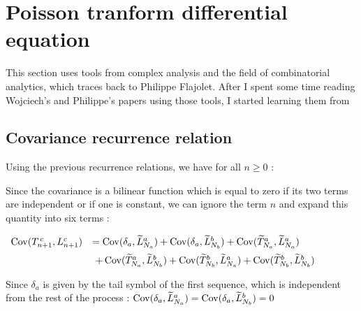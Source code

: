 \section{ Poisson tranform differential equation }

This section uses tools from complex analysis and the field 
of combinatorial analytics, which traces back to Philippe
Flajolet. After I spent some time reading Wojciech's and 
Philippe's papers using those tools, I started learning 
them from~\cite{ave}

\subsection{ Covariance recurrence relation }

Using the previous recurrence relations, we have for all $n\geq 0$ :


Since the covariance is a bilinear function which is equal
to zero if its two terms are independent or if one is constant,
we can ignore the term $n$ and expand this quantity into six terms :

\vspace{\baselineskip}
$
\begin{array}{rl}
   \operatorname{Cov}(T_{n+1}^{\,c}, L_{n+1}^c) 
    &
            = \operatorname{Cov}( \delta_a, {{\widetilde{L}}_{N_a}}^a )
              + \operatorname{Cov} (\delta_a,  {{\widetilde{L}}_{N_b}}^b)
              + \operatorname{Cov} ( {{\widetilde{T}}_{N_a}}^a,
                         {{\widetilde{L}}_{N_a}}^a ) \\[2mm]
    & \,\,
              + \operatorname{Cov} ( {{\widetilde{T}}_{N_a}}^a, 
                          {{\widetilde{L}}_{N_b}}^b )
              + \operatorname{Cov} ( {{\widetilde{T}}_{N_b}}^b,
                          {{\widetilde{L}}_{N_a}}^a ) 
              + \operatorname{Cov} ( {{\widetilde{T}}_{N_b}}^b, 
                          {{\widetilde{L}}_{N_b}}^b )
\end{array}
$
\vspace{\baselineskip}


Since $\delta_a$ is given by the tail symbol of the first sequence, which
is independent from the rest of the process :
$  \operatorname{Cov}( \delta_a, {{\widetilde{L}}_{N_a}}^a ) = 
       \operatorname{Cov}( \delta_a, {{\widetilde{L}}_{N_b}}^b ) = 0 $

